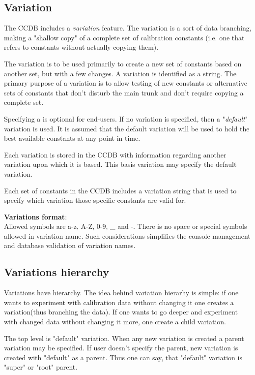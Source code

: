 \documentclass{article}
\begin{document}
\subsection{Variation}
The CCDB includes a \textit{variation} feature. The variation is a sort
of data branching, making a "shallow copy" of a complete set of calibration
constants (i.e. one that refers to constants without actually copying them).

The variation is to be used primarily to create a new set of constants based
on another set, but with a few changes. A variation is identified as a string.
The primary purpose of a variation is to allow testing of new constants or
alternative sets of constants that don't disturb the main trunk and don't
require copying a complete set.

Specifying a is optional for end-users. If no variation is specified, then a
"\textit{default}" variation is used. It is assumed that the default variation
will be used to hold the best available constants at any point in time.

Each variation is stored in the CCDB with information regarding another
variation upon which it is based. This basis variation may specify the default variation.

Each set of constants in the CCDB includes a variation string that is used to
specify which variation those specific constants are valid for.

\textbf{Variations format}:\\
Allowed symbols are a-z, A-Z, 0-9, \_ and -. There is no space or special symbols
allowed in variation name. Such considerations simplifies the console management
and database validation of variation names.

\subsection{Variations hierarchy}

Variations have hierarchy. The idea behind variation hierarhy is simple:
if one wants to experiment with calibration data without changing it
one creates a variation(thus branching the data). If one wants to go deeper
and experiment with changed data without changing it more, one create a child variation. 

The top level is "default" variation.
When any new variation is created a parent variation may be specified. 
If user doesn't specify the parent, new variation is created with "default" as
a parent. Thus one can say, that "default" variation is "super" or "root" parent. 
\end{document}
